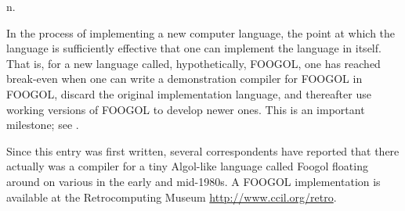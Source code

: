  n.

In the process of implementing a new computer language, the point at which the
language is sufficiently effective that one can implement the language in
itself. That is, for a new language called, hypothetically, FOOGOL, one has
reached break-even when one can write a demonstration compiler for FOOGOL in
FOOGOL, discard the original implementation language, and thereafter use working
versions of FOOGOL to develop newer ones. This is an important milestone; see
.

Since this entry was first written, several correspondents have reported that
there actually was a compiler for a tiny Algol-like language called Foogol
floating around on various  in the early and mid-1980s. A
FOOGOL implementation is available at the Retrocomputing Museum
\url{http://www.ccil.org/retro}.

